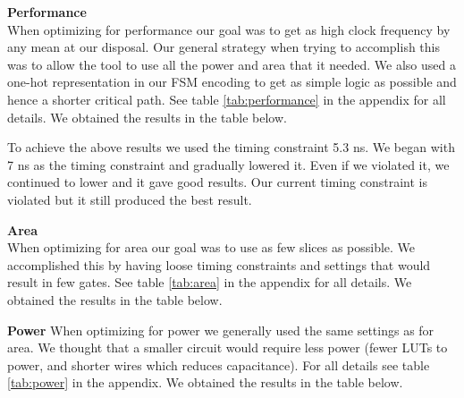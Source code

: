 \documentclass[a4paper,11pt]{article}
\begin{document}
\textbf{Performance} \\
When optimizing for performance our goal was to get as high clock frequency by any mean at our disposal. Our general strategy when trying to accomplish this was to allow the tool to use all the power and area that it needed. We also used a one-hot representation in our FSM encoding to get as simple logic as possible and hence a shorter critical path. See table \ref{tab:performance} in the appendix for all details. We obtained the results in the table below.


To achieve the above results we used the timing constraint 5.3 ns. We began with 7 ns as the timing constraint and gradually lowered it. Even if we violated it, we continued to lower and it gave good results. Our current timing constraint is violated but it still produced the best result.

\textbf{Area}\\
When optimizing for area our goal was to use as few slices as possible. We accomplished this by having loose timing constraints and settings that would result in few gates. See table \ref{tab:area} in the appendix for all details. We obtained the results in the table below.


\textbf{Power}
When optimizing for power we generally used the same settings as for area. We thought that a smaller circuit would require less power (fewer LUTs to power, and shorter wires which reduces capacitance). For all details see table \ref{tab:power} in the appendix. We obtained the results in the table below.
\end{document}
